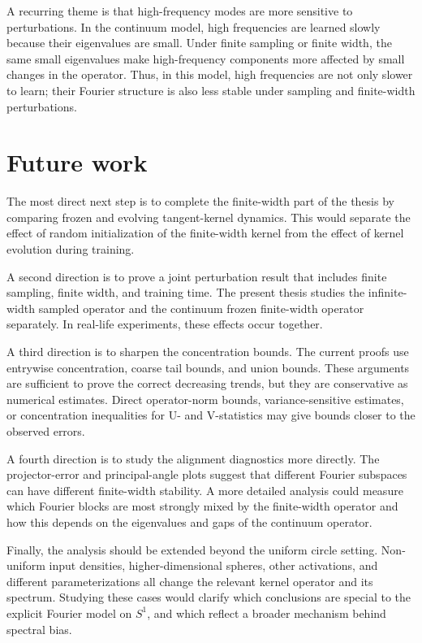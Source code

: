 A recurring theme is that high-frequency modes are more sensitive to
perturbations. In the continuum model, high frequencies are learned slowly
because their eigenvalues are small. Under finite sampling or finite width, the
same small eigenvalues make high-frequency components more affected by small
changes in the operator. Thus, in this model, high frequencies are not only
slower to learn; their Fourier structure is also less stable under sampling and
finite-width perturbations.

\section{Future work}
\label{sec:future-work}

The most direct next step is to complete the finite-width part of the thesis by
comparing frozen and evolving tangent-kernel dynamics. This would separate the
effect of random initialization of the finite-width kernel from the effect of
kernel evolution during training.

A second direction is to prove a joint perturbation result that includes finite
sampling, finite width, and training time. The present thesis studies the
infinite-width sampled operator and the continuum frozen finite-width operator
separately. In real-life experiments, these effects occur together.

A third direction is to sharpen the concentration bounds. The current proofs use
entrywise concentration, coarse tail bounds, and union bounds. These arguments
are sufficient to prove the correct decreasing trends, but they are conservative
as numerical estimates. Direct operator-norm bounds, variance-sensitive
estimates, or concentration inequalities for U- and V-statistics may give bounds
closer to the observed errors.

A fourth direction is to study the alignment diagnostics more directly. The
projector-error and principal-angle plots suggest that different Fourier
subspaces can have different finite-width stability. A more detailed analysis
could measure which Fourier blocks are most strongly mixed by the finite-width
operator and how this depends on the eigenvalues and gaps of the continuum
operator.

Finally, the analysis should be extended beyond the uniform circle setting.
Non-uniform input densities, higher-dimensional spheres, other activations, and
different parameterizations all change the relevant kernel operator and its
spectrum. Studying these cases would clarify which conclusions are special to
the explicit Fourier model on \(S^1\), and which reflect a broader mechanism
behind spectral bias.
